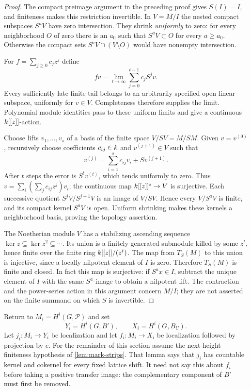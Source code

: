 \begin{proof}
The compact preimage argument in the preceding proof gives
$S(I)=I$, and finiteness makes this restriction invertible.  In
$V=M/I$ the nested compact subspaces $S^aV$ have zero intersection.
They shrink \emph{uniformly} to zero: for every neighborhood $O$
of zero there is an $a_0$ such that $S^aV\subset O$ for every
$a\geq a_0$.  Otherwise the compact sets
$S^aV\cap(V\setminus O)$ would have nonempty intersection.

For $f=\sum_{j\geq0}c_jz^j$ define
\[
 f v=\lim_{t\to\infty}\sum_{j=0}^{t-1}c_jS^jv.
\]
Every sufficiently late finite tail belongs to an arbitrarily
specified open linear subspace, uniformly for $v\in V$.
Completeness therefore supplies the limit.  Polynomial module
identities pass to these uniform limits and give a continuous
$k[[z]]$-action.

Choose lifts $v_1,\ldots,v_s$ of a basis of the finite space
$V/SV=M/SM$.  Given $v=v^{(0)}$, recursively choose coefficients
$c_{ij}\in k$ and $v^{(j+1)}\in V$ such that
\[
 v^{(j)}=\sum_{i=1}^s c_{ij}v_i+Sv^{(j+1)}.
\]
After $t$ steps the error is $S^tv^{(t)}$, which tends uniformly
to zero.  Thus
$v=\sum_i(\sum_jc_{ij}z^j)v_i$; the continuous map
$k[[z]]^s\to V$ is surjective.  Each successive quotient
$S^jV/S^{j+1}V$ is an image of $V/SV$.  Hence every $V/S^aV$ is
finite, and its compact kernel $S^aV$ is open.  Uniform shrinking
makes these kernels a neighborhood basis, proving the topology
assertion.

The Noetherian module $V$ has a stabilizing ascending sequence
$\ker z\subseteq\ker z^2\subseteq\cdots$.  Its union is a
finitely generated submodule killed by some $z^t$, hence finite over
the finite ring $k[[z]]/(z^t)$.  The map from $T_S(M)$ to this
union is injective, since a locally nilpotent element of $I$ is
zero.  Therefore $T_S(M)$ is finite and closed.  In fact this map
is surjective: if $S^a x\in I$, subtract the unique element of $I$
with the same $S^a$-image to obtain a nilpotent lift.  The contraction
and the power-series action in this argument concern $M/I$; they
are not asserted on the finite summand on which $S$ is invertible.
\end{proof}

Return to $M_i=H^i(G,\mathcal P)$ and set
\[
 Y_i=H^i(G,B'),\qquad X_i=H^i(G,B_U).
\]
Let $j_i:M_i\to Y_i$ be localization and let
$f_i:M_i\to X_i$ be localization followed by projection by $e$.
For the remainder of this section assume the next-height finiteness
hypothesis of \cref{lem:mark-strips}.  That lemma says that $j_i$
has countable kernel and cokernel for every fixed lattice shift.
It need not say this about $f_i$ before taking a positive transfer
image: the complementary component of $B'$ must first be removed.


